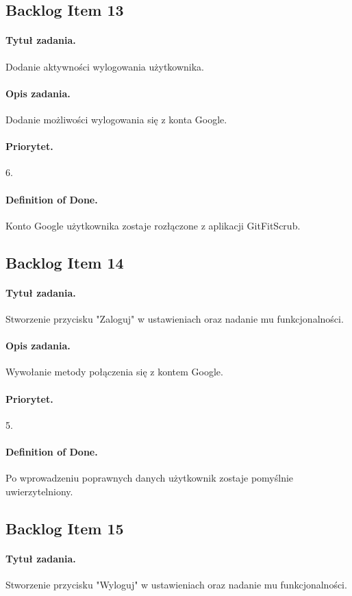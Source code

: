 \documentclass[a4paper]{article}
\begin{document}
\subsection{Backlog Item 13}
\paragraph{Tytuł zadania.} Dodanie aktywności wylogowania użytkownika.
\paragraph{Opis zadania.} Dodanie możliwości wylogowania się z konta Google.
\paragraph{Priorytet.} 6.
\paragraph{Definition of Done.} Konto Google użytkownika zostaje rozłączone z aplikacji GitFitScrub.

\subsection{Backlog Item 14} 
\paragraph{Tytuł zadania.} Stworzenie przycisku "Zaloguj" w ustawieniach oraz nadanie mu funkcjonalności.
\paragraph{Opis zadania.} Wywołanie metody połączenia się z kontem Google.
\paragraph{Priorytet.} 5.
\paragraph{Definition of Done.} Po wprowadzeniu poprawnych danych użytkownik zostaje pomyślnie uwierzytelniony.

\subsection{Backlog Item 15}
\paragraph{Tytuł zadania.} Stworzenie przycisku "Wyloguj" w ustawieniach oraz nadanie mu funkcjonalności.
\end{document}
